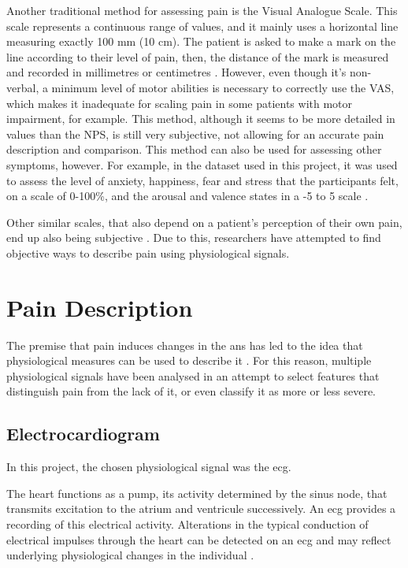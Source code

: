 Another traditional method for assessing pain is the Visual Analogue Scale. This scale represents a continuous range of values, and it mainly uses a horizontal line measuring exactly 100 mm (10 cm). The patient is asked to make a mark on the line according to their level of pain, then, the distance of the mark is measured and recorded in millimetres or centimetres \cite{Bielewicz2022}. However, even though it’s non-verbal, a minimum level of motor abilities is necessary to correctly use the VAS, which makes it inadequate for scaling pain in some patients with motor impairment, for example. This method, although it seems to be more detailed in values than the NPS, is still very subjective, not allowing for an accurate pain description and comparison. This method can also be used for assessing other symptoms, however. For example, in the dataset used in this project, it was used to assess the level of anxiety, happiness, fear and stress that the participants felt, on a scale of 0-100\%, and the arousal and valence states in a -5 to 5 scale \cite{Alves2024}.

Other similar scales, that also depend on a patient's perception of their own pain, end up also being subjective \cite{Adeboye2021}\cite{Robinson2024}. Due to this, researchers have attempted to find objective ways to describe pain using physiological signals.


\section{Pain Description}

The premise that pain induces changes in the \ac{ans} has led to the idea that physiological measures can be used to describe it \cite{Rojas2023}. For this reason, multiple physiological signals have been analysed in an attempt to select features that distinguish pain from the lack of it, or even classify it as more or less severe. 






\subsection{Electrocardiogram}

In this project, the chosen physiological signal was the \ac{ecg}.

The heart functions as a pump, its activity determined by the sinus node, that transmits excitation to the atrium and ventricule successively. An \ac{ecg} provides a recording of this electrical activity. Alterations in the typical conduction of electrical impulses through the heart can be detected on an \ac{ecg} and may reflect underlying physiological changes in the individual \cite{Liu2022}.

